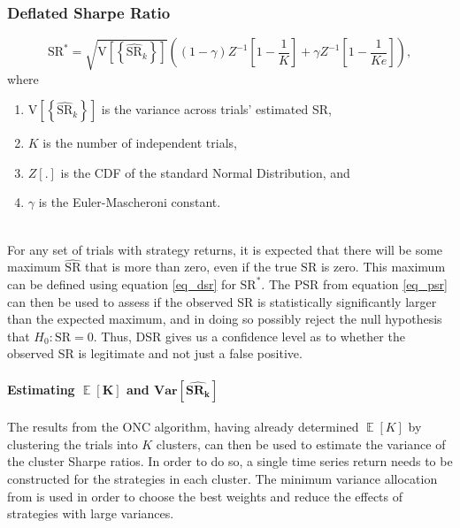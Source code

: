 \documentclass[a4paper,11pt,oneside]{article}
\newcommand{\Var}{\mathbf{Var}}
\DeclareMathOperator*{\E}{\mathbb{E}}
\theoremstyle{plain}
\theoremstyle{definition}
\begin{document}
		\subsubsection{Deflated Sharpe Ratio}\label{imp_dsr_detail}
	\begin{equation}\label{eq_dsr}
	\mathrm{SR}^{*}=\sqrt{\mathrm{V}\left[\left\{\widehat{\mathrm{SR}}_{k}\right\}\right]}\left((1-\gamma) Z^{-1}\left[1-\frac{1}{K}\right]+\gamma Z^{-1}\left[1-\frac{1}{K e}\right]\right), 
	\end{equation}
	where
	\begin{enumerate}
		\item $\mathrm{V}\left[\left\{\widehat{\mathrm{SR}}_{k}\right\}\right]$ is the variance across trials' estimated SR, 
		\item $K$ is the number of independent trials, 
		\item $Z[.]$ is the CDF of the standard Normal Distribution, and
		\item $\gamma$ is the Euler-Mascheroni constant.
	\end{enumerate}
	~\\
	For any set of trials with strategy returns, it is expected that there will be some maximum $\widehat{\mathrm{SR}}$ that is more than zero, even if the true $\mathrm{SR}$ is zero. This maximum can be defined using equation \eqref{eq_dsr} for $\mathrm{SR}^*$. The PSR from equation \eqref{eq_psr} can then be used to assess if the observed SR is statistically significantly larger than the expected maximum, and in doing so possibly reject the null hypothesis that $H_0: \mathrm{SR} = 0$. Thus, DSR gives us a confidence level as to whether the observed SR is legitimate and not just a false positive.
	
	\paragraph{Estimating $\mathbf{\E}\left[\mathbf{K}\right]$ and $\mathbf{\Var}\left[\widehat{\mathbf{SR_k}}\right]$}\label{dsr_cluster_estimates}
	
	The results from the ONC algorithm, having already determined $\mathbf{\E}\left[K\right]$ by clustering the trials into $K$ clusters, can then be used to estimate the variance of the cluster Sharpe ratios. In order to do so, a single time series return needs to be constructed for the strategies in each cluster. The minimum variance allocation from \citet{LopezPrado2016a} is used in order to choose the best weights and reduce the effects of strategies with large variances.\newline
\end{document}
